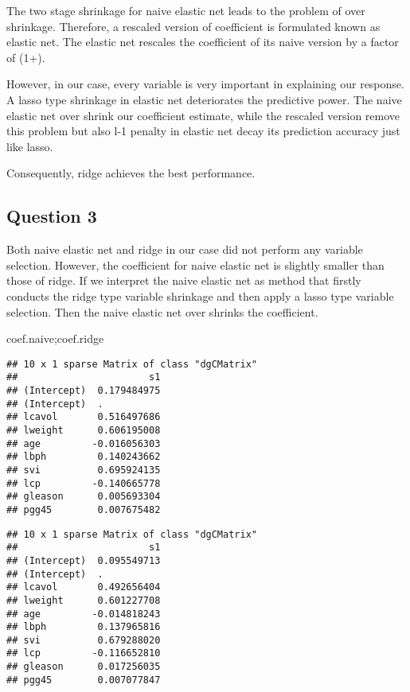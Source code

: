 \documentclass[
]{article}
\newenvironment{Shaded}{\begin{snugshade}}{\end{snugshade}}
\newcommand{\NormalTok}[1]{#1}
\begin{document}
The two stage shrinkage for naive elastic net leads to the problem of
over shrinkage. Therefore, a rescaled version of coefficient is
formulated known as elastic net. The elastic net rescales the
coefficient of its naive version by a factor of (1+).

However, in our case, every variable is very important in explaining our
response. A lasso type shrinkage in elastic net deteriorates the
predictive power. The naive elastic net over shrink our coefficient
estimate, while the rescaled version remove this problem but also l-1
penalty in elastic net decay its prediction accuracy just like lasso.

Consequently, ridge achieves the best performance.

\hypertarget{question-3}{%
\subsection{Question 3}\label{question-3}}

Both naive elastic net and ridge in our case did not perform any
variable selection. However, the coefficient for naive elastic net is
slightly smaller than those of ridge. If we interpret the naive elastic
net as method that firstly conducts the ridge type variable shrinkage
and then apply a lasso type variable selection. Then the naive elastic
net over shrinks the coefficient.

\begin{Shaded}
\begin{Highlighting}[]
\NormalTok{coef.naive;coef.ridge}
\end{Highlighting}
\end{Shaded}

\begin{verbatim}
## 10 x 1 sparse Matrix of class "dgCMatrix"
##                       s1
## (Intercept)  0.179484975
## (Intercept)  .          
## lcavol       0.516497686
## lweight      0.606195008
## age         -0.016056303
## lbph         0.140243662
## svi          0.695924135
## lcp         -0.140665778
## gleason      0.005693304
## pgg45        0.007675482
\end{verbatim}

\begin{verbatim}
## 10 x 1 sparse Matrix of class "dgCMatrix"
##                       s1
## (Intercept)  0.095549713
## (Intercept)  .          
## lcavol       0.492656404
## lweight      0.601227708
## age         -0.014818243
## lbph         0.137965816
## svi          0.679288020
## lcp         -0.116652810
## gleason      0.017256035
## pgg45        0.007077847
\end{verbatim}
\end{document}
